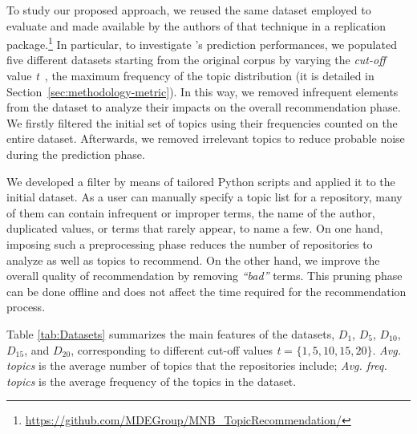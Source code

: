 To study our proposed approach, we reused the same dataset employed to evaluate 
\MNB and made available by the authors of that technique in a replication 
package.\footnote{\url{https://github.com/MDEGroup/MNB\_TopicRecommendation/}} 
%
%
In particular, to investigate \TF's prediction performances, we populated five 
different datasets starting from the original \MNB corpus by varying the 
\textit{cut-off} value \emph{t}~\cite{10.1145/3383219.3383227}, \ie the 
maximum frequency of the topic distribution (it 
is detailed in Section~\ref{sec:methodology-metric}). In this way, we removed 
infrequent elements from the dataset to analyze their impacts on the overall 
recommendation phase. We firstly filtered the initial set of topics using their 
frequencies counted on the entire \GH dataset. Afterwards, we removed 
irrelevant topics to reduce probable noise during the prediction phase. 


We developed a filter by means of tailored Python scripts and 
applied it to the initial dataset. As a \GH user can manually specify a topic 
list for a repository, many of them can contain infrequent or improper terms, 
\ie the name 
of the author, duplicated values, or terms that rarely appear, to name a few. 
On one hand, imposing such a preprocessing phase reduces the number of 
repositories to analyze as well as topics to recommend. On the other hand, we 
improve the overall quality of recommendation by removing \emph{``bad''} terms. 
This pruning phase can be done offline and does not affect the time required 
for the recommendation process.



Table \ref{tab:Datasets} summarizes the main features of the datasets, \ie 
$D_1$, $D_5$, $D_{10}$, $D_{15}$, and $D_{20}$, corresponding to different cut-off values \emph{t} = $\{1, 5, 10, 15, 20\}$. \emph{Avg. topics} is the average number of topics that the 
repositories include; \emph{Avg. freq. topics} is the average frequency of the topics in the 
dataset.%


